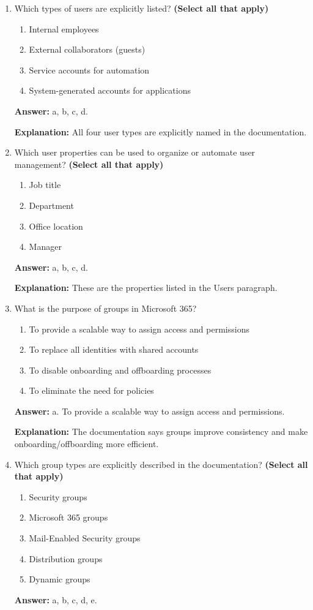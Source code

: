 \documentclass[10pt]{article}
\begin{document}
\begin{enumerate}[leftmargin=*]
\textbf{Explanation:} The documentation says a user in Microsoft Entra ID represents an individual identity.

\item Which types of users are explicitly listed? \textbf{(Select all that apply)}
\begin{enumerate}[label=\alph*., leftmargin=1.5em]
\item Internal employees
\item External collaborators (guests)
\item Service accounts for automation
\item System-generated accounts for applications
\end{enumerate}
\textbf{Answer:} a, b, c, d.

\textbf{Explanation:} All four user types are explicitly named in the documentation.

\item Which user properties can be used to organize or automate user management? \textbf{(Select all that apply)}
\begin{enumerate}[label=\alph*., leftmargin=1.5em]
\item Job title
\item Department
\item Office location
\item Manager
\end{enumerate}
\textbf{Answer:} a, b, c, d.

\textbf{Explanation:} These are the properties listed in the Users paragraph.

\item What is the purpose of groups in Microsoft 365?
\begin{enumerate}[label=\alph*., leftmargin=1.5em]
\item To provide a scalable way to assign access and permissions
\item To replace all identities with shared accounts
\item To disable onboarding and offboarding processes
\item To eliminate the need for policies
\end{enumerate}
\textbf{Answer:} a. To provide a scalable way to assign access and permissions.

\textbf{Explanation:} The documentation says groups improve consistency and make onboarding/offboarding more efficient.

\item Which group types are explicitly described in the documentation? \textbf{(Select all that apply)}
\begin{enumerate}[label=\alph*., leftmargin=1.5em]
\item Security groups
\item Microsoft 365 groups
\item Mail-Enabled Security groups
\item Distribution groups
\item Dynamic groups
\end{enumerate}
\textbf{Answer:} a, b, c, d, e.


\end{enumerate}
\end{document}
